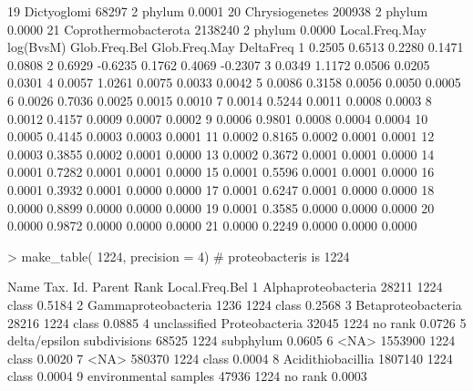 \documentclass{article}
\begin{document}
\begin{Schunk}
\begin{Soutput}
19                    Dictyoglomi    68297      2  phylum         0.0001
20                 Chrysiogenetes   200938      2  phylum         0.0000
21           Coprothermobacterota  2138240      2  phylum         0.0000
   Local.Freq.May log(BvsM) Glob.Freq.Bel Glob.Freq.May DeltaFreq
1          0.2505    0.6513        0.2280        0.1471    0.0808
2          0.6929   -0.6235        0.1762        0.4069   -0.2307
3          0.0349    1.1172        0.0506        0.0205    0.0301
4          0.0057    1.0261        0.0075        0.0033    0.0042
5          0.0086    0.3158        0.0056        0.0050    0.0005
6          0.0026    0.7036        0.0025        0.0015    0.0010
7          0.0014    0.5244        0.0011        0.0008    0.0003
8          0.0012    0.4157        0.0009        0.0007    0.0002
9          0.0006    0.9801        0.0008        0.0004    0.0004
10         0.0005    0.4145        0.0003        0.0003    0.0001
11         0.0002    0.8165        0.0002        0.0001    0.0001
12         0.0003    0.3855        0.0002        0.0001    0.0000
13         0.0002    0.3672        0.0001        0.0001    0.0000
14         0.0001    0.7282        0.0001        0.0001    0.0000
15         0.0001    0.5596        0.0001        0.0001    0.0000
16         0.0001    0.3932        0.0001        0.0000    0.0000
17         0.0001    0.6247        0.0001        0.0000    0.0000
18         0.0000    0.8899        0.0000        0.0000    0.0000
19         0.0001    0.3585        0.0000        0.0000    0.0000
20         0.0000    0.9872        0.0000        0.0000    0.0000
21         0.0000    0.2249        0.0000        0.0000    0.0000
\end{Soutput}
\begin{Sinput}
> make_table( 1224, precision = 4) # proteobacteris is 1224
\end{Sinput}
\begin{Soutput}
                          Name Tax. Id. Parent      Rank Local.Freq.Bel
1          Alphaproteobacteria    28211   1224     class         0.5184
2          Gammaproteobacteria     1236   1224     class         0.2568
3           Betaproteobacteria    28216   1224     class         0.0885
4  unclassified Proteobacteria    32045   1224   no rank         0.0726
5   delta/epsilon subdivisions    68525   1224 subphylum         0.0605
6                         <NA>  1553900   1224     class         0.0020
7                         <NA>   580370   1224     class         0.0004
8            Acidithiobacillia  1807140   1224     class         0.0004
9        environmental samples    47936   1224   no rank         0.0003

\end{Soutput}
\end{Schunk}
\end{document}
